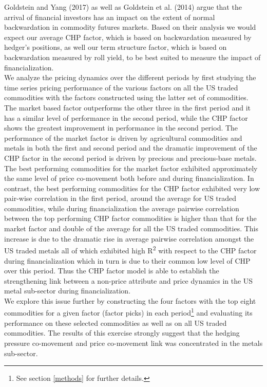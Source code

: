 \documentclass[]{elsarticle} %
\begin{document}
Goldstein and Yang (2017) as well as Goldstein et al. (2014) argue that
the arrival of financial investors has an impact on the extent of normal
backwardation in commodity futures markets. Based on their analysis we
would expect our average CHP factor, which is based on backwardation
measured by hedger's positions, as well our term structure factor, which
is based on backwardation measured by roll yield, to be best suited to
measure the impact of financialization.\\
We analyze the pricing dynamics over the different periods by first
studying the time series pricing performance of the various factors on
all the US traded commodities with the factors constructed using the
latter set of commodities. The market based factor outperforms the other
three in the first period and it has a similar level of performance in
the second period, while the CHP factor shows the greatest improvement
in performance in the second period. The performance of the market
factor is driven by agricultural commodities and metals in both the
first and second period and the dramatic improvement of the CHP factor
in the second period is driven by precious and precious-base metals. The
best performing commodities for the market factor exhibited
approximately the same level of price co-movement both before and during
financialization. In contrast, the best performing commodities for the
CHP factor exhibited very low pair-wise correlation in the first period,
around the average for US traded commodities, while during
financialization the average pairwise correlation between the top
performing CHP factor commodities is higher than that for the market
factor and double of the average for all the US traded commodities. This
increase is due to the dramatic rise in average pairwise correlation
amongst the US traded metals all of which exhibited high
R\textsuperscript{2} with respect to the CHP factor during
financialization which in turn is due to their common low level of CHP
over this period. Thus the CHP factor model is able to establish the
strengthening link between a non-price attribute and price dynamics in
the US metal sub-sector during financialization.\\
We explore this issue further by constructing the four factors with the
top eight commodities for a given factor (factor picks) in each
period\footnote{See section \ref{methods} for further details.} and
evaluating its performance on these selected commodities as well as on
all US traded commodities. The results of this exercise strongly suggest
that the hedging pressure co-movement and price co-movement link was
concentrated in the metals sub-sector.
\end{document}
